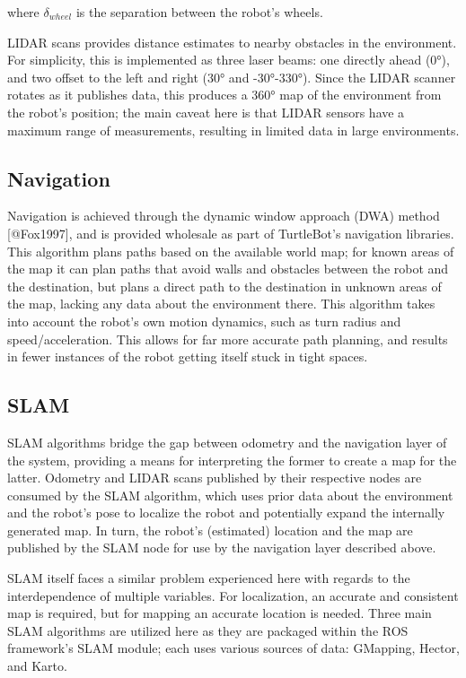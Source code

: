 \documentclass{article}
\begin{document}
where $\delta_{wheel}$ is the separation between the robot's wheels.

LIDAR scans provides distance estimates to nearby obstacles in the environment. For simplicity, this is implemented as three laser beams: one directly ahead (0°), and two offset to the left and right (30° and -30°-330°). Since the LIDAR scanner rotates as it publishes data, this produces a 360° map of the environment from the robot's position; the main caveat here is that LIDAR sensors have a maximum range of measurements, resulting in limited data in large environments.

\subsection{Navigation}
Navigation is achieved through the dynamic window approach (DWA) method [@Fox1997], and is provided wholesale as part of TurtleBot's navigation libraries. This algorithm plans paths based on the available world map; for known areas of the map it can plan paths that avoid walls and obstacles between the robot and the destination, but plans a direct path to the destination in unknown areas of the map, lacking any data about the environment there. This algorithm takes into account the robot's own motion dynamics, such as turn radius and speed/acceleration. This allows for far more accurate path planning, and results in fewer instances of the robot getting itself stuck in tight spaces.

\subsection{SLAM}
SLAM algorithms bridge the gap between odometry and the navigation layer of the system, providing a means for interpreting the former to create a map for the latter. Odometry and LIDAR scans published by their respective nodes are consumed by the SLAM algorithm, which uses prior data about the environment and the robot's pose to localize the robot and potentially expand the internally generated map. In turn, the robot's (estimated) location and the map are published by the SLAM node for use by the navigation layer described above.

SLAM itself faces a similar problem experienced here with regards to the interdependence of multiple variables. For localization, an accurate and consistent map is required, but for mapping an accurate location is needed. Three main SLAM algorithms are utilized here as they are packaged within the ROS framework's SLAM module; each uses various sources of data: GMapping, Hector, and Karto. 
\end{document}
